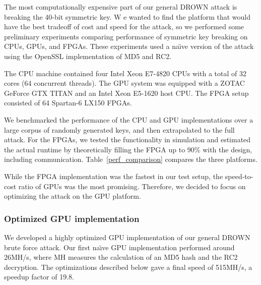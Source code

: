 
The most computationally expensive part of our general DROWN attack is breaking the 40-bit symmetric key.  W
e wanted to find the platform that would have the best tradeoff of cost and speed for the attack, so we performed some preliminary experiments comparing performance of symmetric key breaking on CPUs, GPUs, and FPGAs.  These experiments used a na\"{\i}ve version of the attack using the OpenSSL implementation of MD5 and RC2.

The CPU machine contained four Intel Xeon E7-4820 CPUs with a total of 32 cores (64 concurrent threads). The GPU system was equipped with a ZOTAC GeForce GTX TITAN and an Intel Xeon E5-1620 host CPU\@. The FPGA setup consisted of 64 Spartan-6 LX150 FPGAs.

We benchmarked the performance of the CPU and GPU implementations over a large corpus of randomly generated keys, and then extrapolated to the full attack.
For the FPGAs, we tested the functionality in simulation and estimated the actual runtime by theoretically filling the FPGA up to 90\% with the design, including communication.
Table~\ref{perf_comparison} compares the three platforms.

While the FPGA implementation was the fastest in our test setup, the speed-to-cost ratio of GPUs was the most promising. Therefore, we decided to focus on optimizing the attack on the GPU platform.
\fi
{}
\subsubsection{Optimized GPU implementation}
\label{sec:gpu_brief}
We developed a highly optimized GPU implementation of our general DROWN brute force attack.  Our first na\"{\i}ve GPU implementation performed around 26MH/s, where MH measures the calculation of an MD5 hash and the RC2 decryption. The optimizations described below gave a final speed of 515MH/s, a speedup factor of 19.8.  
\fi

